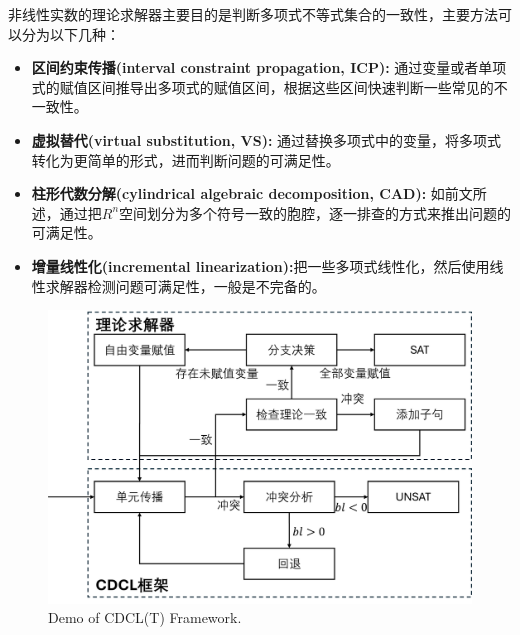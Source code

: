 非线性实数的理论求解器主要目的是判断多项式不等式集合的一致性，主要方法可以分为以下几种：
\begin{itemize}
    \item \textbf{区间约束传播(interval constraint propagation, ICP):} 通过变量或者单项式的赋值区间推导出多项式的赋值区间，根据这些区间快速判断一些常见的不一致性。
    \item \textbf{虚拟替代(virtual substitution, VS):} 通过替换多项式中的变量，将多项式转化为更简单的形式，进而判断问题的可满足性。
    \item \textbf{柱形代数分解(cylindrical algebraic decomposition, CAD):} 如前文所述，通过把$R^n$空间划分为多个符号一致的胞腔，逐一排查的方式来推出问题的可满足性。
    \item \textbf{增量线性化(incremental linearization):}把一些多项式线性化，然后使用线性求解器检测问题可满足性，一般是不完备的。
\end{itemize}

\begin{figure}[t]
    \centering
    \includegraphics[width=0.6\columnwidth]{Img/cdcl_t.png}
     {Demo of CDCL(T) Framework.}
    \label{fig:cdclt}
\end{figure}

